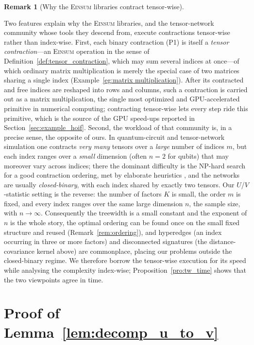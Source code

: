 \documentclass[sn-mathphys, natbib=false]{sn-jnl}
\theoremstyle{plain}
\theoremstyle{definition}
\newtheorem{remark}{Remark}
\def\Einsum{\textsc{Einsum}}
\newif\ifshowchanges
\newcommand{\rev}[1]{%
  \ifshowchanges
    {\color{red} #1}%
  \else
    #1%
  \fi
}
\begin{document}
\begin{bibunit}[agsm]
\begin{remark}[Why the \Einsum{} libraries contract tensor-wise]
\label{rem:why_tensorwise}
\rev{Two features explain why the \Einsum{} libraries, and the tensor-network community whose tools they descend from, execute contractions tensor-wise rather than index-wise. First, each binary contraction (P1) is itself a \emph{tensor contraction}---an \Einsum{} operation in the sense of Definition~\ref{def:tensor_contraction}, which may sum several indices at once---of which ordinary matrix multiplication is merely the special case of two matrices sharing a single index (Example~\ref{eg:matrix multiplication}). After its contracted and free indices are reshaped into rows and columns, such a contraction is carried out as a matrix multiplication, the single most optimized and GPU-accelerated primitive in numerical computing; contracting tensor-wise lets every step ride this primitive, which is the source of the GPU speed-ups reported in Section~\ref{sec:example_hoif}. Second, the workload of that community is, in a precise sense, the opposite of ours. In quantum-circuit and tensor-network simulation one contracts \emph{very many} tensors over a \emph{large} number of indices $m$, but each index ranges over a \emph{small} dimension (often $n = 2$ for qubits) that may moreover vary across indices; there the dominant difficulty is the NP-hard search for a good contraction ordering, met by elaborate heuristics \citep{markov2008simulating, gray2021hyper}, and the networks are usually \emph{closed-binary}, with each index shared by exactly two tensors. Our $U$/$V$-statistic setting is the reverse: the number of factors $K$ is small, the order $m$ is fixed, and every index ranges over the same large dimension $n$, the sample size, with $n \to \infty$. Consequently the treewidth is a small constant and the exponent of $n$ is the whole story, the optimal ordering can be found once on the small fixed structure and reused (Remark~\ref{rem:ordering}), and hyperedges (an index occurring in three or more factors) and disconnected signatures (the distance-covariance kernel above) are commonplace, placing our problems outside the closed-binary regime. We therefore borrow the tensor-wise execution for its speed while analysing the complexity index-wise; Proposition~\ref{pro:tw_time} shows that the two viewpoints agree in time.}
\end{remark}


\section{Proof of Lemma~\ref{lem:decomp_u_to_v}}
\label{app:decomp_u_stats}


\end{bibunit}
\end{document}
